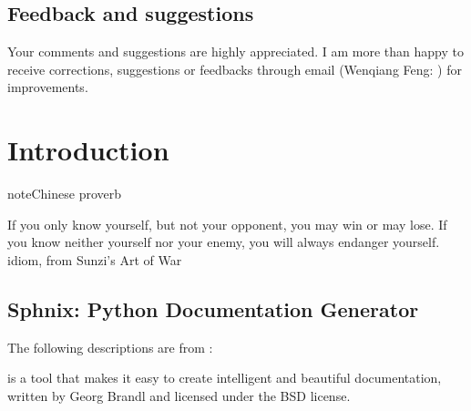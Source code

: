 \documentclass[letterpaper,12pt,english]{sphinxmanual}
\begin{document}
\section{Feedback and suggestions}
\label{\detokenize{preface:feedback-and-suggestions}}
Your comments and suggestions are highly appreciated. I am more than happy to receive
corrections, suggestions or feedbacks through email (Wenqiang Feng: ) for improvements.


\chapter{Introduction}
\label{\detokenize{intro:introduction}}\label{\detokenize{intro:intro}}\label{\detokenize{intro::doc}}
\begin{sphinxadmonition}{note}{Chinese proverb}

If you only know yourself, but not your opponent, you may win or may lose.
If you know neither yourself nor your enemy, you will always endanger yourself.
\textendash{} idiom, from Sunzi’s Art of War
\end{sphinxadmonition}


\section{Sphnix: Python Documentation Generator}
\label{\detokenize{intro:sphnix-python-documentation-generator}}
The following descriptions are from :

 is a tool that makes it easy to create intelligent and beautiful documentation, written by Georg Brandl and licensed under the BSD license.
\end{document}
